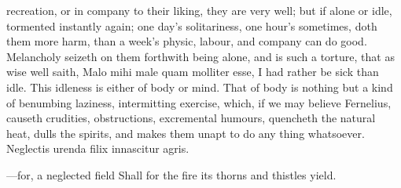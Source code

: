 {{recreation, or in company to their liking, they are very well; but if
alone or idle, tormented instantly again; one day's solitariness, one
hour's sometimes, doth them more harm, than a week's physic, labour,
and company can do good. Melancholy seizeth on them forthwith being
alone, and is such a torture, that as wise \Seneca well saith, Malo mihi
male quam molliter esse, I had rather be sick than idle. This idleness
is either of body or mind. That of body is nothing but a kind of
benumbing laziness, intermitting exercise, which, if we may believe
Fernelius, causeth crudities, obstructions, excremental humours,
quencheth the natural heat, dulls the spirits, and makes them unapt to
do any thing whatsoever.
Neglectis urenda filix innascitur agris.

---for, a neglected field
Shall for the fire its thorns and thistles yield.

}}
